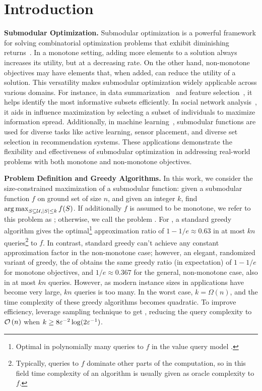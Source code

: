 \section{Introduction}
\textbf{Submodular Optimization.} Submodular optimization is a powerful framework for solving combinatorial optimization problems that exhibit diminishing returns~\citep{Nemhauser1978,feige1995approximating,cornuejols1977exceptional}. In a monotone setting, adding more elements to a solution always increases its utility, but at a decreasing rate. On the other hand, non-monotone objectives may have elements that, when added, can reduce the utility of a solution. This versatility makes submodular optimization widely applicable across various domains. For instance, in data summarization~\citep{DBLP:conf/aaai/MirzasoleimanJ018,DBLP:conf/nips/TschiatschekIWB14} and feature selection~\citep{DBLP:journals/corr/abs-2202-00132}, it helps identify the most informative subsets efficiently. In social network analysis~\citep{DBLP:conf/kdd/KempeKT03}, it aids in influence maximization by selecting a subset of individuals to maximize information spread. Additionally, in machine learning~\citep{DBLP:conf/acl/BairiIRB15,DBLP:conf/nips/ElenbergDFK17,DBLP:conf/iclr/PrajapatMZ024}, submodular functions are used for diverse tasks like active learning, sensor placement, and diverse set selection in recommendation systems. These applications demonstrate the flexibility and effectiveness of submodular optimization in addressing real-world problems with both monotone and non-monotone objectives. %

\textbf{Problem Definition and Greedy Algorithms.} In this work, we consider the size-constrained maximization of a submodular function: given a submodular function $f$ on ground set of size $n$, and given an integer $k$, find $\operatorname*{arg\,max}_{S \subseteq \mathcal U, |S| \le k} f(S)$. If additionally $f$ is assumed to be monotone, we refer to this problem as \mon{}; otherwise, we call the problem \nmon{}. 
For \mon{}, a standard greedy algorithm gives the optimal\footnote{Optimal in polynomially many queries to $f$ in the value query model \citep{Nemhauser1978a}.} approximation ratio
of $1 - 1/e \approx 0.63$ \citep{Nemhauser1978} in
at most $kn$ queries\footnote{Typically, queries to $f$ dominate other parts of the computation, so in this field time complexity of an algorithm is usually given as oracle complexity to $f$.} to $f$.
In contrast, standard greedy can't achieve any constant
approximation factor in the non-monotone case; however,
an elegant, randomized variant of greedy, the \randomgreedy{}
of \citet{Buchbinder2014a} obtains the same greedy
ratio (in expectation) of $1-1/e$ for monotone objectives, and $1/e \approx 0.367$ for the general,
non-monotone case, also in at most $kn$ queries. 
However, as modern instance sizes in applications have become very large,
$kn$ queries is too many. In the worst case, $k = \Omega(n)$, and
the time complexity of these greedy algorithms becomes quadratic.
To improve efficiency, \citet{DBLP:journals/mor/BuchbinderFS17} 
leverage sampling technique to get \frg,
reducing the query complexity to $\mathcal O \left( n \right)$ when
$k \ge 8\varepsilon^{-2}\log(2\varepsilon^{-1})$.

